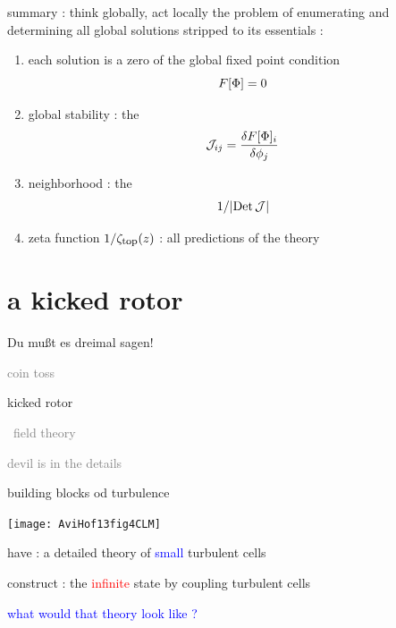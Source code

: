 \begin{frame}{summary : think globally, act locally}
\bigskip
the problem of enumerating and determining all global solutions stripped
to its essentials :
\bigskip
\begin{enumerate}
              \item
each solution is a zero of the global {\color{blue}fixed point} condition
\[
F[\Phi] = 0
\]
              \item
{\color{blue}global stability} :  the {\jacobianOrb}
\[
{\cal J}_{ij} =\frac{\delta F[\Phi]_i}{\delta \phi_j}
\]
              \item
{\color{blue}{\lattstate} neighborhood} : the {\HillDet}
\[
1/|\mbox{\rm Det}\,{\cal J}|
\]

              \item
{\color{blue}zeta function} $1/\zeta_{\mbox{\footnotesize top}} (z)$ : all predictions of the theory
            \end{enumerate}
\end{frame} %


\section[a kicked rotor]
 {a kicked rotor}

\begin{frame}{}
\begin{bartlett}{
Du mu{\ss}t es dreimal sagen!
        }
\end{bartlett}
\vfill
\begin{enumerate}
              \item \textcolor{gray}{\small
coin toss
                  }
              \item {\Large
kicked rotor
                  }\textcolor{gray}{\small
              \item
\spt\ field theory
              \item
devil is in the details
                    }
            \end{enumerate}
\end{frame} %


\begin{frame}{building blocks od turbulence}
\begin{center}
\texttt{[image: AviHof13fig4CLM]}
\end{center}
have : a detailed theory of {\small \textcolor{blue}{small}} turbulent cells

\bigskip

construct : the \textcolor{red}{infinite} state by coupling turbulent
cells
\vfill

\textcolor{blue}{what would that theory look like ?}
\end{frame} %

